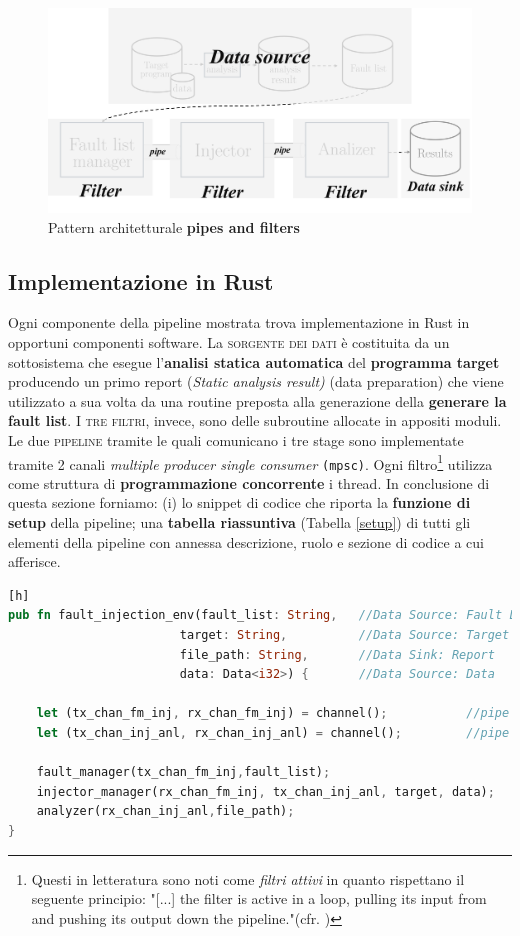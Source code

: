 \begin{figure}[h]
    \centering
    \includegraphics[scale=0.5]{img/pipeline_mapped.png}
    \caption{Pattern architetturale \textbf{pipes and filters}}
\end{figure}

\subsection{Implementazione in Rust}
Ogni componente della pipeline mostrata trova implementazione in Rust in opportuni componenti software. La \textsc{sorgente dei dati} è costituita da un sottosistema che esegue l'\textbf{analisi statica automatica} del \textbf{programma target} producendo un primo report (\textit{Static analysis result)} (data preparation) che viene utilizzato a sua volta da una routine preposta alla generazione della \textbf{generare la fault list}. I \textsc{tre filtri}, invece, sono delle subroutine allocate in appositi moduli. Le due \textsc{pipeline} tramite le quali comunicano i tre stage sono implementate tramite 2 canali \textit{multiple producer single consumer} \texttt{(mpsc)}. Ogni filtro\footnote{
    Questi in letteratura sono noti come \textit{filtri attivi} in quanto rispettano il seguente principio: "[...] the filter is active in a loop, pulling its input from
    and pushing its output down the pipeline."(cfr. \cite{schmidt2013pattern})
} utilizza come struttura di \textbf{programmazione concorrente} i thread.
In conclusione di questa sezione forniamo: (i) lo snippet di codice che riporta la \textbf{funzione di setup} della pipeline; una \textbf{tabella riassuntiva} (Tabella \ref{setup}) di tutti gli elementi della pipeline con annessa descrizione, ruolo e sezione di codice a cui afferisce.\newpage

\begin{lstlisting}[language=rust, style=boxed][h]
pub fn fault_injection_env(fault_list: String,   //Data Source: Fault List
                        target: String,          //Data Source: Target program
                        file_path: String,       //Data Sink: Report
                        data: Data<i32>) {       //Data Source: Data

    let (tx_chan_fm_inj, rx_chan_fm_inj) = channel();           //pipe FLM-FIM
    let (tx_chan_inj_anl, rx_chan_inj_anl) = channel();         //pipe FIM-Analyzer

    fault_manager(tx_chan_fm_inj,fault_list);
    injector_manager(rx_chan_fm_inj, tx_chan_inj_anl, target, data);
    analyzer(rx_chan_inj_anl,file_path);
}
\end{lstlisting}

